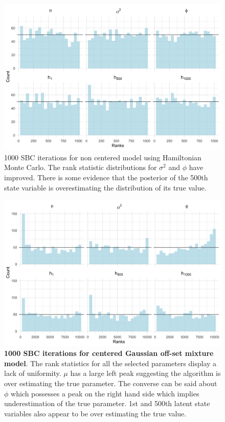 \documentclass[12pt, a4paper]{article}
\begin{document}
        \begin{figure}[H]
        \centering
        \includegraphics[scale=0.09]{results/hmc_ncp_1k.png}
        \caption{1000 SBC iterations for non centered model using Hamiltonian Monte Carlo. The rank statistic distributions for $\sigma^2$ and $\phi$ have improved. There is some evidence that the posterior of the 500th state variable is overestimating the distribution of its true value.}
        \label{fig:ncphmc1k}
    \end{figure}

        \begin{figure}[H]
        \centering
        \includegraphics[scale=0.1]{results/ksc_cp_1k.png}
        \caption{\textbf{1000 SBC iterations for centered Gaussian off-set mixture model}. The rank statistics for all the selected parameters display a lack of uniformity. $\mu$ has a large left peak suggesting the algorithm is over estimating the true parameter. The converse can be said about $\phi$ which possesses a peak on the right hand side which implies underestimation of the true parameter. 1st and 500th latent state variables also appear to be over estimating the true value.}
        \label{fig:cpksc1k}
    \end{figure}
\end{document}
